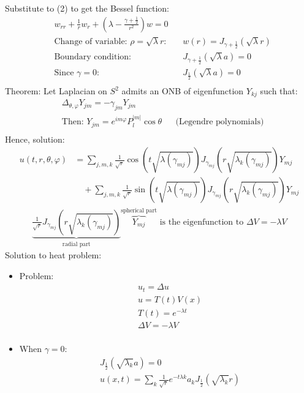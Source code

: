 \documentclass[12pt, a4paper]{article}
\begin{document}
Substitute to (2) to get the Bessel function:
\begin{align*}
    &w_{rr} + \frac{1}{r}w_r + \left(\lambda - \frac{\gamma + \frac{1}{2}}{r^2}\right)w = 0\\
    &\text{Change of variable: $\rho = \sqrt{\lambda}r$: } &&w(r) = J_{\gamma + \frac{1}{2}}(\sqrt{\lambda}r)\\
    &\text{Boundary condition: }&&J_{\gamma + \frac{1}{2}}(\sqrt{\lambda}a) = 0\\
    &\text{Since $\gamma = 0$: }&&J_{\frac{1}{2}}(\sqrt{\lambda}a) = 0\\
\end{align*}
Theorem: Let Laplacian on $S^2$ admits an ONB of eigenfunction $Y_{kj}$ such that:
\begin{align*}
    &\Delta_{\theta, \varphi}Y_{jm} = -\gamma_{jm}Y_{jm}\\
    &\text{Then: }Y_{jm} = e^{im\varphi}P_l^{|m|}\cos\theta &&\text{(Legendre polynomials)}\\
\end{align*}
Hence, solution:
\begin{align*}
    u(t, r, \theta, \varphi) &= \sum_{j,m,k}\frac{1}{\sqrt{r}}\cos\left(t\sqrt{\lambda(\gamma_{mj})}\right)J_{\gamma_{mj}}\left(r\sqrt{\lambda_k(\gamma_{mj})}\right)Y_{mj}\\
    &\quad+\sum_{j,m,k}\frac{1}{\sqrt{r}}\sin\left(t\sqrt{\lambda(\gamma_{mj})}\right)J_{\gamma_{mj}}\left(r\sqrt{\lambda_k(\gamma_{mj})}\right)Y_{mj}
\end{align*}
\begin{align*}
    \underbrace{\frac{1}{\sqrt{r}}J_{\gamma_{mj}}\left(r\sqrt{\lambda_k(\gamma_{mj})}\right)}_{\text{radial part}}\overbrace{Y_{mj}}^{\text{spherical part}} \text{ is the eigenfunction to $\Delta V = -\lambda V$}
\end{align*}\newpage
\noindent Solution to heat problem:
\begin{itemize}
    \item Problem:
    \begin{align*}
        &u_t = \Delta u\\
        &u = T(t)V(x)\\
        &T(t) = e^{-\lambda t}\\
        &\Delta V = -\lambda V\\
    \end{align*}
    \item When $\gamma = 0$:
    \begin{align*}
        &J_{\frac{1}{2}}(\sqrt{\lambda_k}a) = 0\\
        &u(x, t) = \sum_k  \frac{1}{\sqrt{r}}e^{-t\lambda k}a_kJ_{\frac{1}{2}}(\sqrt{\lambda_k}r)
    \end{align*}
\end{itemize}
\vspace{0.3em}
\end{document}
